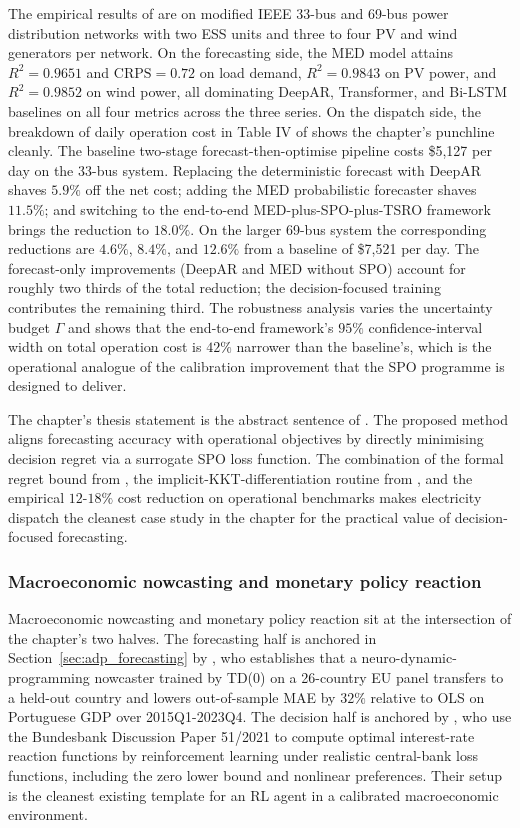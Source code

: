 The empirical results of \citet{CaoXu2025} are on modified IEEE 33-bus and
69-bus power distribution networks with two ESS units and three to four
PV and wind generators per network. On the forecasting side, the MED model
attains $R^2 = 0.9651$ and $\mathrm{CRPS} = 0.72$ on load demand, $R^2 =
0.9843$ on PV power, and $R^2 = 0.9852$ on wind power, all dominating
DeepAR, Transformer, and Bi-LSTM baselines on all four metrics across the
three series. On the dispatch side, the breakdown of daily operation cost in
Table IV of \citet{CaoXu2025} shows the chapter's punchline cleanly. The
baseline two-stage forecast-then-optimise pipeline costs \$5{,}127 per day on
the 33-bus system. Replacing the deterministic forecast with DeepAR shaves
$5.9\%$ off the net cost; adding the MED probabilistic forecaster shaves
$11.5\%$; and switching to the end-to-end MED-plus-SPO-plus-TSRO framework
brings the reduction to $18.0\%$. On the larger 69-bus system the
corresponding reductions are $4.6\%$, $8.4\%$, and $12.6\%$ from a baseline of
\$7{,}521 per day. The forecast-only improvements (DeepAR and MED without
SPO) account for roughly two thirds of the total reduction; the
decision-focused training contributes the remaining third. The robustness
analysis varies the uncertainty budget $\Gamma$ and shows that the
end-to-end framework's $95\%$ confidence-interval width on total operation
cost is $42\%$ narrower than the baseline's, which is the operational
analogue of the calibration improvement that the SPO programme is designed
to deliver.

The chapter's thesis statement is the abstract sentence of \citet{CaoXu2025}.
The proposed method aligns forecasting accuracy with operational objectives
by directly minimising decision regret via a surrogate SPO loss function. The
combination of the formal regret bound from \citet{LiuGrigas2021},
the implicit-KKT-differentiation routine from \citet{DontiAmosKolter2017}, and
the empirical $12$-$18\%$ cost reduction on operational benchmarks makes
electricity dispatch the cleanest case study in the chapter for the practical
value of decision-focused forecasting.

\subsubsection{Macroeconomic nowcasting and monetary policy reaction}
\label{sec:app_macro}

Macroeconomic nowcasting and monetary policy reaction sit at the intersection
of the chapter's two halves. The forecasting half is anchored in
Section~\ref{sec:adp_forecasting} by \citet{Fernandes2024}, who establishes
that a neuro-dynamic-programming nowcaster trained by TD(0) on a 26-country EU
panel transfers to a held-out country and lowers out-of-sample MAE by $32\%$
relative to OLS on Portuguese GDP over 2015Q1-2023Q4. The decision half is
anchored by \citet{HinterlangTaenzer2024}, who use the Bundesbank Discussion
Paper 51/2021 to compute optimal interest-rate reaction functions by
reinforcement learning under realistic central-bank loss functions, including
the zero lower bound and nonlinear preferences. Their setup is the cleanest
existing template for an RL agent in a calibrated macroeconomic environment.

